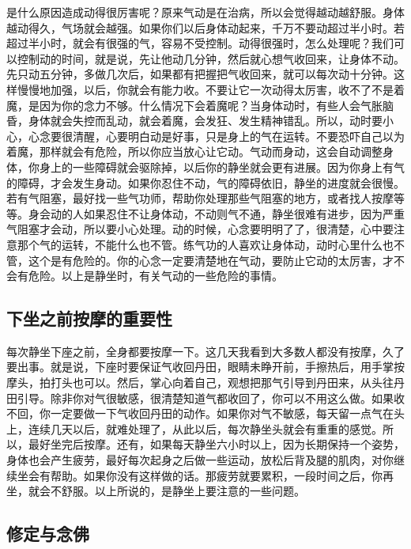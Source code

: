 \documentclass{book}
\begin{document}
是什么原因造成动得很厉害呢？原来气动是在治病，所以会觉得越动越舒服。身体越动得久，气场就会越强。如果你们以后身体动起来，千万不要动超过半小时。若超过半小时，就会有很强的气，容易不受控制。动得很强时，怎么处理呢？我们可以控制动的时间，就是说，先让他动几分钟，然后就心想气收回来，让身体不动。先只动五分钟，多做几次后，如果都有把握把气收回来，就可以每次动十分钟。这样慢慢地加强，以后，你就会有能力收。不要让它一次动得太厉害，收不了不是着魔，是因为你的念力不够。什么情况下会着魔呢？当身体动时，有些人会气胀脑昏，身体就会失控而乱动，就会着魔，会发狂、发生精神错乱。所以，动时要小心，心念要很清醒，心要明白动是好事，只是身上的气在运转。不要恐吓自己以为着魔，那样就会有危险，所以你应当放心让它动。气动而身动，这会自动调整身体，你身上的一些障碍就会驱除掉，以后你的静坐就会更有进展。因为你身上有气的障碍，才会发生身动。如果你忍住不动，气的障碍依旧，静坐的进度就会很慢。若有气阻塞，最好找一些气功师，帮助你处理那些气阻塞的地方，或者找人按摩等等。身会动的人如果忍住不让身体动，不动则气不通，静坐很难有进步，因为严重气阻塞才会动，所以要小心处理。动的时候，心念要明明了了，很清楚，心中要注意那个气的运转，不能什么也不管。练气功的人喜欢让身体动，动时心里什么也不管，这个是有危险的。你的心念一定要清楚地在气动，要防止它动的太厉害，才不会有危险。以上是静坐时，有关气动的一些危险的事情。

\subsection{下坐之前按摩的重要性}

每次静坐下座之前，全身都要按摩一下。这几天我看到大多数人都没有按摩，久了要出事。就是说，下座时要保证气收回丹田，眼睛未睁开前，手擦热后，用手掌按摩头，拍打头也可以。然后，掌心向着自己，观想把那气引导到丹田来，从头往丹田引导。除非你对气很敏感，很清楚知道气都收回了，你可以不用这么做。如果收不回，你一定要做一下气收回丹田的动作。如果你对气不敏感，每天留一点气在头上，连续几天以后，就难处理了，从此以后，每次静坐头就会有重重的感觉。所以，最好坐完后按摩。还有，如果每天静坐六小时以上，因为长期保持一个姿势，身体也会产生疲劳，最好每次起身之后做一些运动，放松后背及腿的肌肉，对你继续坐会有帮助。如果你没有这样做的话。那疲劳就要累积，一段时间之后，你再坐，就会不舒服。以上所说的，是静坐上要注意的一些问题。

\subsection{修定与念佛}
\end{document}
